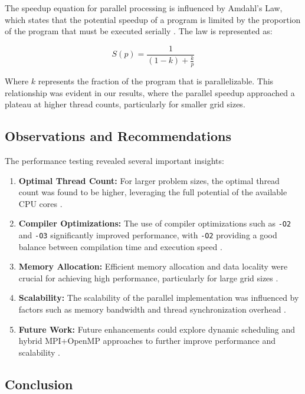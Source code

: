 \documentclass{article}
\begin{document}
The speedup equation for parallel processing is influenced by Amdahl’s Law, which states that the potential speedup of a program is limited by the proportion of the program that must be executed serially \parencite{armbrust2010cloud}. The law is represented as:

\[
S(p) = \frac{1}{(1 - k) + \frac{k}{p}}
\]

Where $k$ represents the fraction of the program that is parallelizable. This relationship was evident in our results, where the parallel speedup approached a plateau at higher thread counts, particularly for smaller grid sizes.

\subsection{Observations and Recommendations}

The performance testing revealed several important insights:

\begin{enumerate}
    \item \textbf{Optimal Thread Count:} For larger problem sizes, the optimal thread count was found to be higher, leveraging the full potential of the available CPU cores \parencite{awspricing, azurepricing, gcppricing}.
    \item \textbf{Compiler Optimizations:} The use of compiler optimizations such as \texttt{-O2} and \texttt{-O3} significantly improved performance, with \texttt{-O2} providing a good balance between compilation time and execution speed \parencite{dillon2010cloud, hashem2015bigdata}.
    \item \textbf{Memory Allocation:} Efficient memory allocation and data locality were crucial for achieving high performance, particularly for large grid sizes \parencite{Ibrahim2024, leitner2016patterns}.
    \item \textbf{Scalability:} The scalability of the parallel implementation was influenced by factors such as memory bandwidth and thread synchronization overhead \parencite{li2019decision, marinescu2013cloud}.
    \item \textbf{Future Work:} Future enhancements could explore dynamic scheduling and hybrid MPI+OpenMP approaches to further improve performance and scalability \parencite{openmp, rehman2018cloud, stergiou2018iot}.
\end{enumerate}

\subsection{Conclusion}
\end{document}
